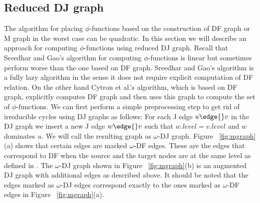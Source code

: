 \subsection{Reduced DJ graph}

The algorithm for placing $\phi$-functions based on the construction of DF graph or M graph 
in the worst case can be quadratic. In this section we will describe an approach for
computing $\phi$-functions using reduced DJ graph. Recall that
Sreedhar and Gao's algorithm for computing $\phi$-functions is linear but sometimes perform
worse than the one based on DF graph. Sreedhar and Gao's algorithm is a fully lazy algorithm
in the sense it does not require explicit computation of DF relation. On the
other hand Cytron et al.'s algorithm, which is based on DF graph, explicitly
computes DF graph and then uses this graph to compute the set of $\phi$-functions. 
We can first perform a simple preprocessing step to get rid of
irreducible cycles using DJ graphs as follows: For each J edge $u \edge{} v$
in the DJ graph we insert a new J edge $w \edge{} v$ such that $w.level = v.level$ and
$w$ dominates $u$. We will call the resulting graph as $\omega$-DJ graph. 
Figure ~\ref{fig:mgraph}(a) shows that certain edges are marked $\omega$-DF edges. These are the
edges that correspond to DF when the source and the target nodes are at the same level as
defined in \cite{bilardi}. The
$\omega$-DJ graph shown in Figure ~\ref{fig:mgraph}(b) is an augmented DJ graph with additional 
edges as described above. It should be noted that the edges marked as $\omega$-DJ edges 
correspond exactly to the ones marked as $\omega$-DF edges in Figure ~\ref{fig:mgraph}(a). 


